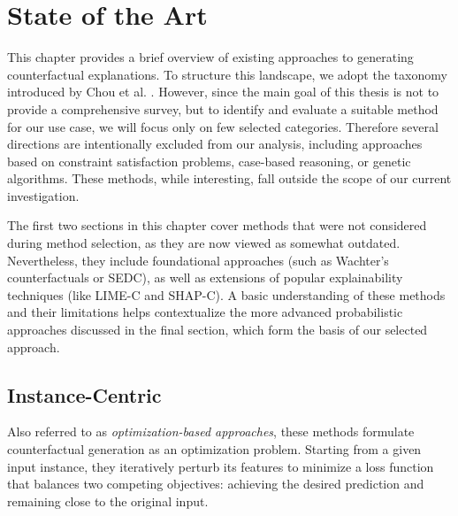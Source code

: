 \chapter{State of the Art}

This chapter provides a brief overview of existing approaches to generating counterfactual explanations.
To structure this landscape, we adopt the taxonomy introduced by Chou et al. \cite{chou2022counterfactuals}.
However, since the main goal of this thesis is not to provide a comprehensive survey,
but to identify and evaluate a suitable method for our use case, we will focus only on few selected categories.
Therefore several directions are intentionally excluded from our analysis,
including approaches based on constraint satisfaction problems, case-based reasoning, or genetic algorithms.
These methods, while interesting, fall outside the scope of our current investigation.

The first two sections in this chapter cover methods that were not considered during method selection,
as they are now viewed as somewhat outdated. Nevertheless, they include foundational approaches (such as Wachter's counterfactuals or SEDC),
as well as extensions of popular explainability techniques (like LIME-C and SHAP-C).
A basic understanding of these methods and their limitations helps
contextualize the more advanced probabilistic approaches discussed in the final section,
which form the basis of our selected approach.

\section{Instance-Centric}

Also referred to as \emph{optimization-based approaches},
these methods formulate counterfactual generation as an optimization problem.
Starting from a given input instance, they iteratively perturb its features to minimize a loss function
that balances two competing objectives: achieving the desired prediction and remaining close to the original input.

